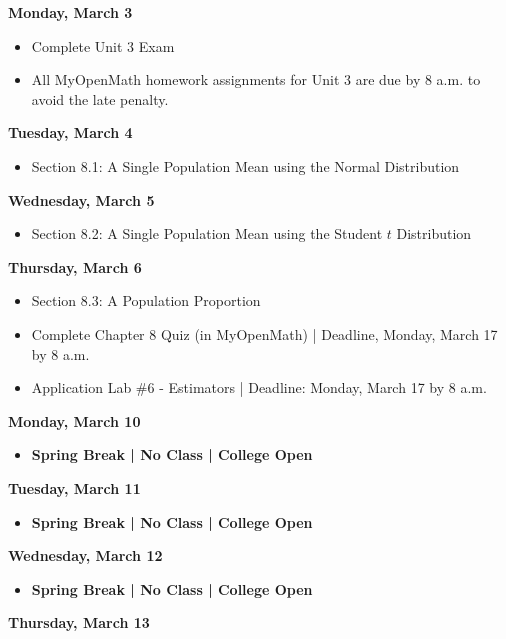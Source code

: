 \documentclass[11pt]{article}
\begin{document}
\textbf{Monday, March 3}

\begin{itemize}
\item Complete Unit 3 Exam
\item All MyOpenMath homework assignments for Unit 3 are due by 8 a.m. to avoid the late penalty.
\end{itemize}

\textbf{Tuesday, March 4}

\begin{itemize}
\item Section 8.1: A Single Population Mean using the Normal Distribution
\end{itemize}

\textbf{Wednesday, March 5}

\begin{itemize}
\item Section 8.2: A Single Population Mean using the Student $t$ Distribution
\end{itemize}

\textbf{Thursday, March 6}

\begin{itemize}
\item Section 8.3: A Population Proportion
\item Complete Chapter 8 Quiz (in MyOpenMath) | Deadline, Monday, March 17 by 8 a.m.
\item Application Lab \#6 - Estimators | Deadline: Monday, March 17 by 8 a.m.
\end{itemize}

\textbf{Monday, March 10}

\begin{itemize}
\item \textbf{Spring Break | No Class | College Open}
\end{itemize}

\textbf{Tuesday, March 11}

\begin{itemize}
\item \textbf{Spring Break | No Class | College Open}
\end{itemize}

\textbf{Wednesday, March 12}

\begin{itemize}
\item \textbf{Spring Break | No Class | College Open}
\end{itemize}

\textbf{Thursday, March 13}
\end{document}
